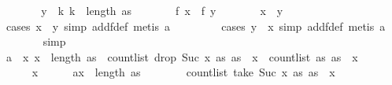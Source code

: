 \begin{isabellebody}
\ \ \ \ \isamarkupfalse%
\ \isamarkupfalse%
\ {\isachardoublequoteopen}y\ {\isasymin}\ {\isacharbraceleft}{\kern0pt}k{\isachardot}{\kern0pt}\ k\ {\isacharless}{\kern0pt}\ length\ as{\isacharbraceright}{\kern0pt}{\isachardoublequoteclose}\isanewline
\ \ \ \ \isamarkupfalse%
\ \isamarkupfalse%
\ {\isachardoublequoteopen}f\ x\ {\isacharequal}{\kern0pt}\ f\ y{\isachardoublequoteclose}\isanewline
\ \ \ \ \isamarkupfalse%
\ \isamarkupfalse%
\ {\isachardoublequoteopen}x\ {\isacharequal}{\kern0pt}\ y{\isachardoublequoteclose}\isanewline
\ \ \ \ \ \ \isamarkupfalse%
\ {\isacharparenleft}{\kern0pt}cases\ {\isachardoublequoteopen}x\ {\isacharless}{\kern0pt}\ y{\isachardoublequoteclose}{\isacharcomma}{\kern0pt}\ simp\ add{\isacharcolon}{\kern0pt}f{\isacharunderscore}{\kern0pt}def{\isacharcomma}{\kern0pt}\ metis\ a{}{\isacharparenright}{\kern0pt}\ \isanewline
\ \ \ \ \ \ \isamarkupfalse%
\ {\isacharparenleft}{\kern0pt}cases\ {\isachardoublequoteopen}y\ {\isacharless}{\kern0pt}\ x{\isachardoublequoteclose}{\isacharcomma}{\kern0pt}\ simp\ add{\isacharcolon}{\kern0pt}f{\isacharunderscore}{\kern0pt}def{\isacharcomma}{\kern0pt}\ metis\ a{}{\isacharparenright}{\kern0pt}\ \isanewline
\ \ \ \ \ \ \isamarkupfalse%
\ simp\isanewline
\ \ \isamarkupfalse%
\isanewline
\ \ \isamarkupfalse%
\ a{}{\isacharunderscore}{\kern0pt}{}{\isacharcolon}{\kern0pt}\ {\isachardoublequoteopen}\ {\isasymAnd}x{\isachardot}{\kern0pt}\ x\ {\isacharless}{\kern0pt}\ length\ as\ {\isasymLongrightarrow}\ count{\isacharunderscore}{\kern0pt}list\ {\isacharparenleft}{\kern0pt}drop\ {\isacharparenleft}{\kern0pt}Suc\ x{\isacharparenright}{\kern0pt}\ as{\isacharparenright}{\kern0pt}\ {\isacharparenleft}{\kern0pt}as\ {\isacharbang}{\kern0pt}\ x{\isacharparenright}{\kern0pt}\ {\isacharless}{\kern0pt}\ count{\isacharunderscore}{\kern0pt}list\ as\ {\isacharparenleft}{\kern0pt}as\ {\isacharbang}{\kern0pt}\ x{\isacharparenright}{\kern0pt}{\isachardoublequoteclose}\isanewline
\ \ \isamarkupfalse%
\ {\isacharminus}{\kern0pt}\isanewline
\ \ \ \ \isamarkupfalse%
\ x\isanewline
\ \ \ \ \isamarkupfalse%
\ a{\isacharcolon}{\kern0pt}{\isachardoublequoteopen}x\ {\isacharless}{\kern0pt}\ length\ as{\isachardoublequoteclose}\isanewline
\ \ \ \ \isamarkupfalse%
\ {\isachardoublequoteopen}{}\ {\isasymle}\ count{\isacharunderscore}{\kern0pt}list\ {\isacharparenleft}{\kern0pt}take\ {\isacharparenleft}{\kern0pt}Suc\ x{\isacharparenright}{\kern0pt}\ as{\isacharparenright}{\kern0pt}\ {\isacharparenleft}{\kern0pt}as\ {\isacharbang}{\kern0pt}\ x{\isacharparenright}{\kern0pt}{\isachardoublequoteclose}\isanewline

\end{isabellebody}
